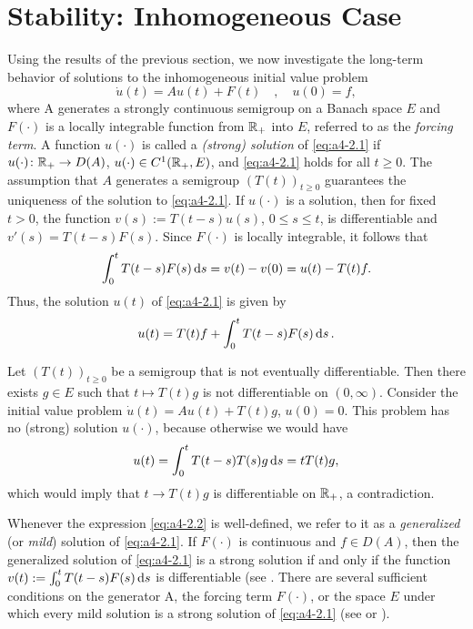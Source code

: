 \section{Stability: Inhomogeneous Case}%
Using the results of the previous section, we now investigate the long-term behavior of solutions to the inhomogeneous initial value
problem
\begin{equation}\label{eq:a4-2.1}
\dot{u}(t) = Au(t) + F(t) \quad , \quad u(0) = f,
\end{equation}
where A generates a strongly continuous semigroup on a
Banach space $ E $ and $F(\cdot)$ is a locally integrable function from $\mathbb{R}_{+}$
into $ E $, referred to as the \emph{forcing term}. 
A function $u(\cdot)$ is called a \emph{(strong) solution} of \eqref{eq:a4-2.1} if $u(\cdot) \colon \mathbb{R}_{+} \to D(A)$, 
$u(\cdot) \in C^{1}(\mathbb{R}_{+},E)$, and \eqref{eq:a4-2.1} holds for all $t \geq 0$.
The assumption that $A$ generates a semigroup $(T(t))_{t \geq 0}$
guarantees the uniqueness of the solution to \eqref{eq:a4-2.1}. 
If $u(\cdot)$ is a solution, then for fixed $t>0$, the function $v(s) := T(t-s)u(s)$, $0 \leq s \leq t$, is
differentiable and $v'(s) = T(t-s)F(s)$. 
Since $F(\cdot)$ is locally integrable, it follows that 
\[
\int_{0}^{t} T(t-s)F(s)  \mathop{}\!\mathrm{d}{s} = v(t) - v(0) = u(t) - T(t)f.
\]
Thus, the solution $u(t)$ of \eqref{eq:a4-2.1} is given by
\begin{equation}\label{eq:a4-2.2}
u(t) = T(t)f + \int_{0}^{t} T(t-s)F(s)  \mathop{}\!\mathrm{d}{s}\,.
\end{equation}


\begin{example*} \label{ex:a4-2.1}
Let $(T(t))_{t \geq 0}$ be a semigroup that is not eventually differentiable. 
Then there
exists $g \in E$ such that $t \mapsto T(t)g$ is not differentiable on $(0,\infty)$.
Consider the initial value problem $\dot{u}(t) = Au(t) + T(t)g$, $u(0) = 0$. This problem has no
(strong) solution $u(\cdot)$, because otherwise we would have 
\begin{align*}
u(t) = \int_{0}^{t} T(t-s)T(s)g  \mathop{}\!\mathrm{d}{s} = tT(t)g,
\end{align*}
which would imply that $t\to T(t)g$ is 
differentiable on $\mathbb{R}_{+}$, a contradiction. 
\end{example*}


Whenever the expression \eqref{eq:a4-2.2} is well-defined, we refer to it as a  \emph{generalized} (or
\emph{mild}) solution of \eqref{eq:a4-2.1}. 
If $F(\cdot)$ is continuous and $f \in D(A)$, then
the generalized solution of \eqref{eq:a4-2.1} is a strong solution if and only if the function 
$v(t) := \int_{0}^{t} T(t-s)F(s)  \mathop{}\!\mathrm{d}{s}$ is differentiable (see \citet[Chapter~4,2.4]{pazy:1983}. 
There are several sufficient conditions on the generator A,
the forcing term $F(\cdot)$, or the space $E$ under which every mild solution
is a strong solution of \eqref{eq:a4-2.1} (see \citet{travis:1981}
or  \citet[Section~4.2]{pazy:1983}).

